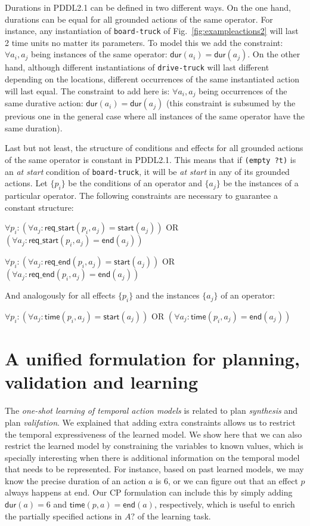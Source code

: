 \documentclass{ecai}
\newcommand{\dur}{\mathsf{dur}}    %
\newcommand{\start}{\mathsf{start}}%
\newcommand{\en}{\mathsf{end}}     %
\newcommand{\tim}{\mathsf{time}}   %
\newcommand{\reqs}{\mathsf{req\_{start}}} %
\newcommand{\reqe}{\mathsf{req\_{end}}}   %
\begin{document}
Durations in PDDL2.1 can be defined in two different ways. On the one hand, durations can be equal for all grounded actions of the same operator. For instance, any instantiation of \texttt{board-truck} of Fig.~\ref{fig:exampleactions2} will last 2 time units no matter its parameters. To model this we add the constraint: $\forall a_i,a_j$ being instances of the same operator: $\dur(a_i) = \dur(a_j)$. On the other hand, although different instantiations of \texttt{drive-truck} will last different depending on the locations, different occurrences of the same instantiated action will last equal. The constraint to add here is: $\forall a_i,a_j$ being occurrences of the same durative action: $\dur(a_i) = \dur(a_j)$ (this constraint is subsumed by the previous one in the general case where all instances of the same operator have the same duration).

Last but not least, the structure of conditions and effects for all grounded actions of the same operator is constant in PDDL2.1. This means that if \texttt{(empty ?t)} is an \emph{at start} condition of \texttt{board-truck}, it will be \emph{at start} in any of its grounded actions.
Let $\{p_i\}$ be the conditions of an operator and $\{a_j\}$ be the instances of a particular operator. The following constraints are necessary to guarantee a constant structure:

$\forall p_i: (\forall a_j: \reqs(p_i,a_j) = \start(a_j))$ OR $(\forall a_j: \reqs(p_i,a_j) = \en(a_j))$

$\forall p_i: (\forall a_j: \reqe(p_i,a_j) = \start(a_j))$ OR $(\forall a_j: \reqe(p_i,a_j) = \en(a_j))$

And analogously for all effects $\{p_i\}$ and the instances $\{a_j\}$ of an operator:

$\forall p_i: (\forall a_j: \tim(p_i,a_j) = \start(a_j))$ OR $(\forall a_j: \tim(p_i,a_j) = \en(a_j))$



\section{A unified formulation for planning, validation and learning}
\label{sec:usingCPValidation}
The {\em one-shot learning of temporal action models} is related to plan {\em synthesis} and plan {\em valifation}. We explained that adding extra constraints allows us to restrict the temporal expressiveness of the learned model. We show here that we can also restrict the learned model by constraining the variables to known values, which is specially interesting when there is additional information on the temporal model that needs to be represented. For instance, based on past learned models, we may know the precise duration of an action $a$ is 6, or we can figure out that an effect $p$ always happens at end. Our CP formulation can include this by simply adding $\dur(a)=6$ and $\tim(p,a)=\en(a)$, respectively, which is useful to enrich the partially specified actions in $A?$ of the learning task.
\end{document}
